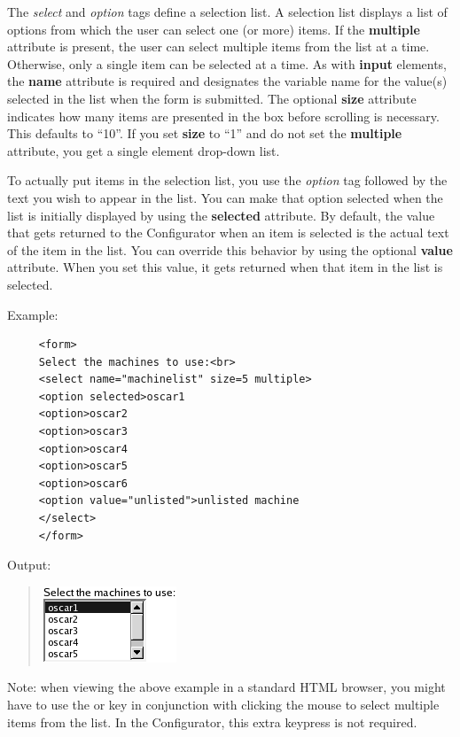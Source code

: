 \begin{itemize}
The \textit{select} and \textit{option} tags define a selection list.
A selection list displays a list of options from which the user can
select one (or more) items. If the \textbf{multiple} attribute is
present, the user can select multiple items from the list at a time.
Otherwise, only a single item can be selected at a time. As with \textbf{input}
elements, the \textbf{name} attribute is required and designates the
variable name for the value(s) selected in the list when the form
is submitted. The optional \textbf{size} attribute indicates how many
items are presented in the box before scrolling is necessary. This
defaults to {}``10''. If you set \textbf{size} to {}``1'' and
do not set the \textbf{multiple} attribute, you get a single element
drop-down list.

To actually put items in the selection list, you use the \textit{option}
tag followed by the text you wish to appear in the list. You can make
that option selected when the list is initially displayed by using
the \textbf{selected} attribute. By default, the value that gets returned
to the Configurator when an item is selected is the actual text of
the item in the list. You can override this behavior by using the
optional \textbf{value} attribute. When you set this value, it gets
returned when that item in the list is selected.

Example:

\begin{footnotesize}
\begin{verbatim}
     <form> 
     Select the machines to use:<br> 
     <select name="machinelist" size=5 multiple> 
     <option selected>oscar1 
     <option>oscar2 
     <option>oscar3 
     <option>oscar4 
     <option>oscar5 
     <option>oscar6 
     <option value="unlisted">unlisted machine 
     </select> 
     </form>
\end{verbatim}
\end{footnotesize}

Output: 

\begin{quote}
\includegraphics[scale=0.5]{figs/SelectMachine}
\end{quote}

Note: when viewing the above example in a standard HTML browser, you might
have to use the  or  key in conjunction with
clicking the mouse to select multiple items from the list. In the
Configurator, this extra keypress is not required.

\end{itemize}

